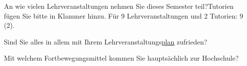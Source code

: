 \separate
\vspace{-.1cm}

\begin{choicequestion}[6]{An wie vielen Lehrveranstaltungen nehmen Sie dieses Semester teil?\newline\small{Tutorien fügen Sie bitte in Klammer hinzu. Für 9 Lehrveranstaltungen und 2 Tutorien: 9 (2).}}
\end{choicequestion}

\vspace{-.1cm}
\separate
\vspace{-.1cm}

\begin{choicequestion}[1]{Sind Sie alles in allem mit Ihrem Lehrveranstaltungs\underline{plan} zufrieden?}
\end{choicequestion}

\vspace{-.1cm}
\separate
\vspace{-.1cm}

\begin{choicequestion}[1]{Mit welchem Fortbewegungsmittel kommen Sie hauptsächlich zur Hochschule?}
\end{choicequestion}

\vspace{-.1cm}
